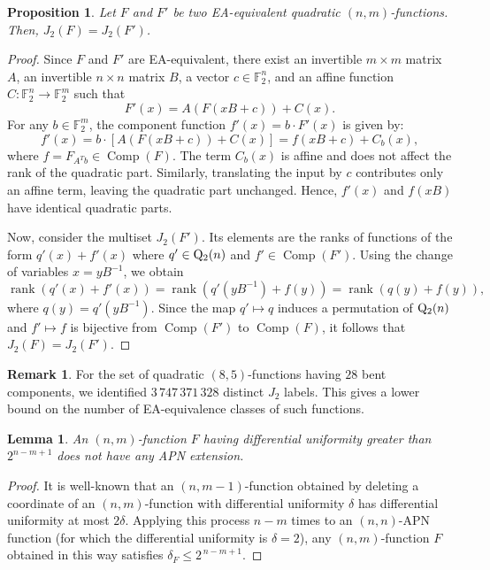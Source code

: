 \documentclass{amsart}[11pt]
\theoremstyle{plain}
\newtheorem{lemma}[theorem]{Lemma}
\newtheorem{proposition}[theorem]{Proposition}
\theoremstyle{definition}
\newtheorem{remark}[theorem]{Remark}
\numberwithin{theorem}{section}
\numberwithin{equation}{section}
\numberwithin{table}{section}
\numberwithin{figure}{section}
\numberwithin{algorithm}{section}
\begin{document}
\begin{proposition}
	Let $F$ and $F'$ be two EA-equivalent quadratic $(n,m)$-functions. Then, $J_2(F) = J_2(F')$.
\end{proposition}
\begin{proof}
	Since $F$ and $F'$ are EA-equivalent, there exist an invertible $m \times m$ matrix $A$, an invertible $n \times n$ matrix $B$, a vector $c \in \mathbb{F}_2^n$, and an affine function $C \colon \mathbb{F}_2^n \to \mathbb{F}_2^m$ such that
		$$F'(x) = A(F(xB + c)) + C(x).$$
	For any $b \in \mathbb{F}_2^m$, the component function $f'(x) = b \cdot F'(x)$ is given by:
		$$f'(x) = b \cdot [A(F(xB + c)) + C(x)] =  f(xB+c) + C_b(x),$$
		where $f=F_{A^Tb}\in\operatorname{Comp}(F)$.
	The term $C_b(x)$ is affine and does not affect the rank of the quadratic part. Similarly, translating the input by $c$ contributes only an affine term, leaving the quadratic part unchanged. Hence, $f'(x)$ and $f(xB)$ have identical quadratic parts.
	
	Now, consider the multiset $J_2(F')$. Its elements are the ranks of functions of the form $q'(x) + f'(x)$ where $q' \in {\rm Q}_2(n)$ and $f' \in \operatorname{Comp}(F')$. Using the change of variables $x = yB^{-1}$, we obtain
	$$\operatorname{rank}(q'(x) + f'(x)) = \operatorname{rank}(q'(yB^{-1}) + f(y))=\operatorname{rank}(q(y) + f(y)),$$
	where $q(y) = q'(yB^{-1})$. Since the map $q' \mapsto q$ induces a permutation of ${\rm Q}_2(n)$ and $f' \mapsto f$ is bijective from $\operatorname{Comp}(F')$ to $\operatorname{Comp}(F)$, it follows that  $J_2(F) = J_2(F')$.
\end{proof}

\begin{remark}
    For the set of quadratic $(8,5)$-functions having $28$ bent components, we identified $3\,747\,371\,328$ distinct $J_2$ labels. This gives a lower bound on the number of EA-equivalence classes of such functions.
\end{remark}

\begin{lemma}
    \label{DIFF}
    An $(n,m)$-function $F$ having differential uniformity greater than $2^{n-m+1}$ does not have any APN extension. 
\end{lemma}
\begin{proof}
It is well-known that an $(n,m-1)$-function obtained by deleting a coordinate of an $(n,m)$-function with differential uniformity $\delta$ has differential uniformity at most $2\delta$. Applying this process $n-m$ times to an $(n,n)$-APN function (for which the differential uniformity is $\delta=2$), any $(n,m)$-function $F$ obtained in this way satisfies $\delta_F\le 2^{\,n-m+1}$.
\end{proof}
\end{document}

